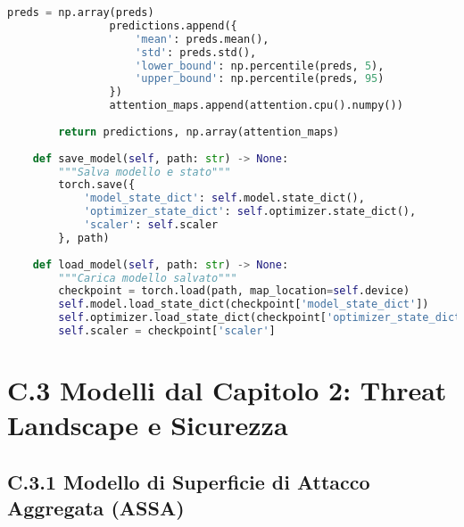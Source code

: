 \begin{lstlisting}[language=Python, caption=LSTM per Previsione Pattern di Attacco]
                preds = np.array(preds)
                predictions.append({
                    'mean': preds.mean(),
                    'std': preds.std(),
                    'lower_bound': np.percentile(preds, 5),
                    'upper_bound': np.percentile(preds, 95)
                })
                attention_maps.append(attention.cpu().numpy())
        
        return predictions, np.array(attention_maps)
    
    def save_model(self, path: str) -> None:
        """Salva modello e stato"""
        torch.save({
            'model_state_dict': self.model.state_dict(),
            'optimizer_state_dict': self.optimizer.state_dict(),
            'scaler': self.scaler
        }, path)
    
    def load_model(self, path: str) -> None:
        """Carica modello salvato"""
        checkpoint = torch.load(path, map_location=self.device)
        self.model.load_state_dict(checkpoint['model_state_dict'])
        self.optimizer.load_state_dict(checkpoint['optimizer_state_dict'])
        self.scaler = checkpoint['scaler']
\end{lstlisting}

\section{C.3 Modelli dal Capitolo 2: Threat Landscape e Sicurezza}

\subsection{C.3.1 Modello di Superficie di Attacco Aggregata (ASSA)}

